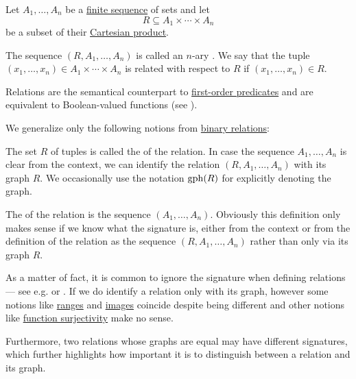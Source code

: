 \begin{definition}\label{def:relation}
  Let \( A_1, \ldots, A_n \) be a \hyperref[def:sequence]{finite sequence} of sets and let
  \begin{equation*}
    R \subseteq A_1 \times \cdots \times A_n
  \end{equation*}
  be a subset of their \hyperref[def:tuple_and_cartesian_product/product]{Cartesian product}.

  The sequence \( (R, A_1, \ldots, A_n) \) is called an \( n \)-ary . We say that the tuple \( (x_1, \ldots, x_n) \in A_1 \times \cdots \times A_n \) is related with respect to \( R \) if \( (x_1, \ldots, x_n) \in R \).

  Relations are the semantical counterpart to \hyperref[def:first_order_structure/interpretation/predicate]{first-order predicates} and are equivalent to Boolean-valued functions (see ).

  We generalize only the following notions from \hyperref[def:binary_relation]{binary relations}:
  \begin{thmenum}[series=def:relation]
     The set \( R \) of tuples is called the  of the relation. In case the sequence \( A_1, \ldots, A_n \) is clear from the context, we can identify the relation \( (R, A_1, \ldots, A_n) \) with its graph \( R \). We occasionally use the notation \( \operatorname{gph}(R) \) for explicitly denoting the graph.

     The  of the relation is the sequence \( (A_1, \ldots, A_n) \). Obviously this definition only makes sense if we know what the signature is, either from the context or from the definition of the relation as the sequence \( (R, A_1, \ldots, A_n) \) rather than only via its graph \( R \).

    As a matter of fact, it is common to ignore the signature when defining relations --- see e.g. \cite[7]{Kelley1955} or \cite[def. 2.1]{OpenLogicFull}. If we do identify a relation only with its graph, however some notions like \hyperref[def:binary_relation/range]{ranges} and \hyperref[def:binary_relation/image]{images} coincide despite being different and other notions like \hyperref[def:function_invertibility/surjective]{function surjectivity} make no sense.

    Furthermore, two relations whose graphs are equal may have different signatures, which further highlights how important it is to distinguish between a relation and its graph.


\end{thmenum}
\end{definition}
